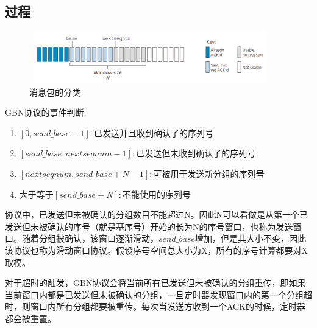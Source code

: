 \documentclass[UTF8,14pt]{article}
\numberwithin{figure}{section}
\begin{document}
\subsection{过程}
\begin{figure}[!htbp]
      \centering
      \setlength{\abovecaptionskip}{0.cm}
      \includegraphics[width=10.55cm,height=2.27cm]{gbn3.png}
      \caption{消息包的分类}
\end{figure}

GBN协议的事件判断:
\begin{enumerate}
      \setlength{\parskip}{-5mm}
      \item $[0,send\_{}base-1]:$已发送并且收到确认了的序列号\\
      \item $[send\_{}base,nextseqnum - 1]:$已发送但未收到确认了的序列号\\
      \item $[nextseqnum, send\_{}base + N - 1]:$可被用于发送新分组的序列号\\
      \item 大于等于$[send\_{}base + N]:$不能使用的序列号\\
\end{enumerate}

协议中，已发送但未被确认的分组数目不能超过N。因此N可以看做是从第一个已发送但未被确认的序号（就是基序号）开始的长为N的序号窗口，也称为发送窗口。随着分组被确认，该窗口逐渐滑动，$send\_ base$增加，但是其大小不变，因此该协议也称为滑动窗口协议。假设序号空间总大小为X，所有的序号计算都要对X取模。

对于超时的触发，GBN协议会将当前所有已发送但未被确认的分组重传，即如果当前窗口内都是已发送但未被确认的分组，一旦定时器发现窗口内的第一个分组超时，则窗口内所有分组都要被重传。每次当发送方收到一个ACK的时候，定时器都会被重置。
\end{document}
